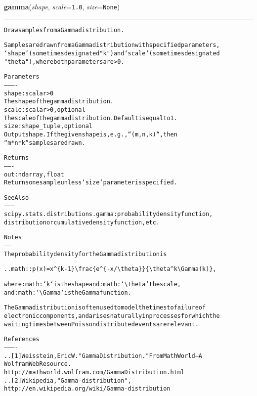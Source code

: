 \hspace{.8\funcindent}\begin{boxedminipage}{\funcwidth}

    \raggedright \textbf{gamma}(\textit{shape}, \textit{scale}={\tt 1.0}, \textit{size}={\tt None})

    \vspace{-1.5ex}

    \rule{\textwidth}{0.5\fboxrule}
\setlength{\parskip}{2ex}
\begin{alltt}
Draw samples from a Gamma distribution.

Samples are drawn from a Gamma distribution with specified parameters,
`shape` (sometimes designated "k") and `scale` (sometimes designated
"theta"), where both parameters are {\textgreater} 0.

Parameters
----------
shape : scalar {\textgreater} 0
    The shape of the gamma distribution.
scale : scalar {\textgreater} 0, optional
    The scale of the gamma distribution.  Default is equal to 1.
size : shape\_tuple, optional
    Output shape.  If the given shape is, e.g., ``(m, n, k)``, then
    ``m * n * k`` samples are drawn.

Returns
-------
out : ndarray, float
    Returns one sample unless `size` parameter is specified.

See Also
--------
scipy.stats.distributions.gamma : probability density function,
    distribution or cumulative density function, etc.

Notes
-----
The probability density for the Gamma distribution is

.. math:: p(x) = x{\textasciicircum}\{k-1\}{\textbackslash}frac\{e{\textasciicircum}\{-x/{\textbackslash}theta\}\}\{{\textbackslash}theta{\textasciicircum}k{\textbackslash}Gamma(k)\},

where :math:`k` is the shape and :math:`{\textbackslash}theta` the scale,
and :math:`{\textbackslash}Gamma` is the Gamma function.

The Gamma distribution is often used to model the times to failure of
electronic components, and arises naturally in processes for which the
waiting times between Poisson distributed events are relevant.

References
----------
.. [1] Weisstein, Eric W. "Gamma Distribution." From MathWorld--A
       Wolfram Web Resource.
       http://mathworld.wolfram.com/GammaDistribution.html
.. [2] Wikipedia, "Gamma-distribution",
       http://en.wikipedia.org/wiki/Gamma-distribution


\end{alltt}
\end{boxedminipage}
